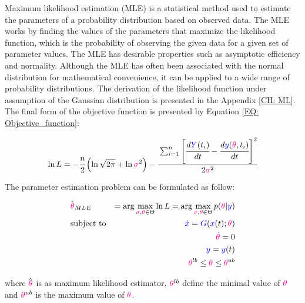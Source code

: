 \documentclass[../Article_Model_Parameters.tex]{subfiles}
\begin{document}
	Maximum likelihood estimation (MLE) is a statistical method used to estimate the parameters of a probability distribution based on observed data. The MLE works by finding the values of the parameters that maximize the likelihood function, which is the probability of observing the given data for a given set of parameter values. The MLE has desirable properties such as asymptotic efficiency and normality. Although the MLE has often been associated with the normal distribution for mathematical convenience, it can be applied to a wide range of probability distributions. The derivation of the likelihood function under assumption of the Gaussian distribution is presented in the Appendix \ref{CH: ML}. The final form of the objective function is presented by Equation \ref{EQ: Objective_function}:
		
	{\footnotesize
		\begin{equation} \label{EQ: Objective_function}
			\ln L = -\cfrac{n}{2} \left( \ln \sqrt{2 \pi} + \ln {\color{magenta} \sigma}^2 \right)
			- \cfrac{ \sum_{i=1}^{n} \left[  \cfrac{d {\color{blue}Y}(t_i)}{dt} - \cfrac{d{\color{blue}y}({\color{magenta} \theta}, t_i)}{dt} \right]^2 }{2 {\color{magenta} \sigma}^2}
		\end{equation}
	}
		
	The parameter estimation problem can be formulated as follow:
		
	{\footnotesize
		\begin{equation}
			\begin{aligned} \label{EQ: Optimization_formulation_MLE}
				&\hat{{\color{magenta} \theta}}_{MLE} &= \arg \max_{{\color{magenta} \sigma}, {\color{magenta} \theta} \in \Theta} \ln L = \arg \max_{{\color{magenta} \sigma},{\color{magenta} \theta} \in \Theta} p({\color{magenta} \theta}|{\color{blue}y}) \\
				&\text{subject to}
				& \dot{ {\color{blue}x} } = {\color{blue}G}({\color{blue} x}(t);{\color{magenta} \theta}) \\
				&& {\color{magenta} \dot{\theta}} = 0 \\
				&& {\color{blue}y} = {\color{blue}y}(t) \\
				&& {\color{magenta} \theta}^{lb} \leq {\color{magenta} \theta} \leq {\color{magenta} \theta}^{ub}
			\end{aligned}
	\end{equation} } 
	
	where $\hat{{\color{magenta} \theta}}$ is as maximum likelihood estimator, ${\color{magenta} \theta}^{lb}$ define the minimal value of ${\color{magenta} \theta}$ and ${\color{magenta} \theta}^{ub}$ is the maximum value of ${\color{magenta} \theta}$.
		
\end{document}
